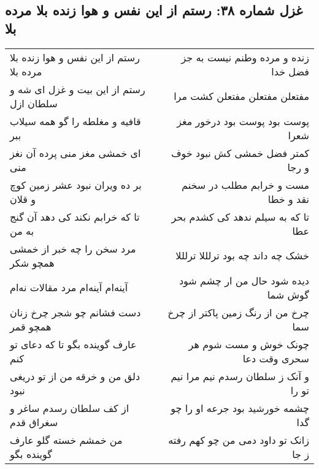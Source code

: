 \begin{center}
\section*{غزل شماره ۳۸: رستم از این نفس و هوا زنده بلا مرده بلا}
\label{sec:0038}
\begin{longtable}{l p{0.5cm} r}
رستم از این نفس و هوا زنده بلا مرده بلا
&&
زنده و مرده وطنم نیست به جز فضل خدا
\\
رستم از این بیت و غزل ای شه و سلطان ازل
&&
مفتعلن مفتعلن مفتعلن کشت مرا
\\
قافیه و مغلطه را گو همه سیلاب ببر
&&
پوست بود پوست بود درخور مغز شعرا
\\
ای خمشی مغز منی پرده آن نغز منی
&&
کمتر فضل خمشی کش نبود خوف و رجا
\\
بر ده ویران نبود عشر زمین کوچ و قلان
&&
مست و خرابم مطلب در سخنم نقد و خطا
\\
تا که خرابم نکند کی دهد آن گنج به من
&&
تا که به سیلم ندهد کی کشدم بحر عطا
\\
مرد سخن را چه خبر از خمشی همچو شکر
&&
خشک چه داند چه بود ترلللا ترلللا
\\
آینه‌ام آینه‌ام مرد مقالات نه‌ام
&&
دیده شود حال من ار چشم شود گوش شما
\\
دست فشانم چو شجر چرخ زنان همچو قمر
&&
چرخ من از رنگ زمین پاکتر از چرخ سما
\\
عارف گوینده بگو تا که دعای تو کنم
&&
چونک خوش و مست شوم هر سحری وقت دعا
\\
دلق من و خرقه من از تو دریغی نبود
&&
و آنک ز سلطان رسدم نیم مرا نیم تو را
\\
از کف سلطان رسدم ساغر و سغراق قدم
&&
چشمه خورشید بود جرعه او را چو گدا
\\
من خمشم خسته گلو عارف گوینده بگو
&&
زانک تو داود دمی من چو کهم رفته ز جا
\\
\end{longtable}
\end{center}
